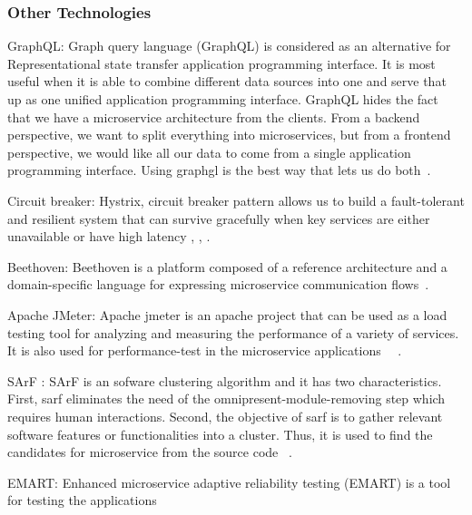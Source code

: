 \subsubsection{Other Technologies}

\par GraphQL: Graph query language (GraphQL) is considered as an alternative for Representational state transfer application programming interface. It is most useful when it is able to combine different data sources into one and serve that up as one unified application programming interface. GraphQL hides the fact that we have a microservice architecture from the clients. From a backend perspective, we want to split everything into microservices, but from a frontend perspective, we would like all our data to come from a single application programming interface. Using graphgl is the best way that lets us do both~\cite{Ghebremicael2017, wang2020, overeem2018, gozneli2020}.

\par Circuit breaker: Hystrix, circuit breaker pattern allows us to build a fault-tolerant and resilient system that can survive gracefully when key services are either unavailable or have high latency \cite{Kalske2017}, \cite{Rodrigue2016}, \cite{Uber}. 

\par Beethoven: Beethoven is a platform composed of a reference architecture and a domain-specific language for expressing microservice communication flows~\cite{Monteiro2020}.

\par Apache JMeter: Apache jmeter is an apache project that can be used as a load testing tool for analyzing and measuring the performance of a variety of services. It is also used for performance-test in the microservice applications ~\cite{Hou2019}~\cite{Johansson2019}.

\par SArF : SArF is an sofware clustering algorithm and it has two characteristics. First, sarf eliminates the need of the omnipresent-module-removing step which requires human interactions. Second, the objective of sarf is to gather relevant software features or functionalities into a cluster. Thus, it is used to find the candidates for microservice from the source code ~\cite{Kamimura2018}.

\par EMART: Enhanced microservice adaptive reliability testing (EMART) is a tool for testing the applications~\cite{Russo2020}

